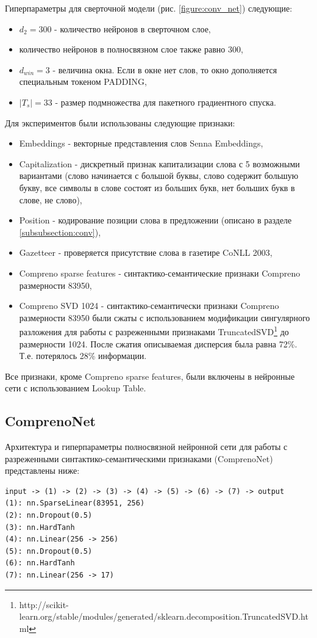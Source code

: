 Гиперпараметры для сверточной модели (рис. \ref{figure:conv_net}) следующие:
\begin{itemize}
\item $d_2 = 300$ - количество нейронов в сверточном слое,
\item количество нейронов в полносвязном слое также равно 300,
\item $d_{win} = 3$ - величина окна. Если в окне нет слов, то окно дополняется специальным токеном PADDING,
\item $|T_s|=33$ - размер подмножества для пакетного градиентного спуска.
\end{itemize}

Для экспериментов были использованы следующие признаки:
\begin{itemize}
\item Embeddings - векторные представления слов Senna Embeddings,
\item Capitalization - дискретный признак капитализации слова с 5 возможными вариантами
(слово начинается с большой буквы, слово содержит большую букву,
все символы в слове состоят из больших букв, нет больших букв в слове, не слово),
\item Position - кодирование позиции слова в предложении (описано в разделе \ref{subsubsection:conv}),
\item Gazetteer - проверяется присутствие слова в газетире CoNLL 2003,
\item Compreno sparse features - синтактико-се\-ман\-ти\-ческие признаки Compreno размерности 83950,
\item Compreno SVD 1024 - синтактико-семантически признаки Compreno размерности 83950 были сжаты с использованием
модификации сингулярного разложения для работы с разреженными признаками
TruncatedSVD\footnote{http://scikit-learn.org/stable/modules/generated/sklearn.decomposition.TruncatedSVD.html}
до размерности 1024. После сжатия описываемая дисперсия была равна 72\%. Т.е. потерялось 28\% информации.
\end{itemize}

Все признаки, кроме Compreno sparse features, были включены в нейронные сети с использованием Lookup Table.


\subsection{ComprenoNet}

Архитектура и гиперпараметры полносвязной нейронной сети для работы с разреженными
синтактико-семантическими признаками (ComprenoNet) представлены ниже:
\begin{lstlisting}
input -> (1) -> (2) -> (3) -> (4) -> (5) -> (6) -> (7) -> output
(1): nn.SparseLinear(83951, 256)
(2): nn.Dropout(0.5)
(3): nn.HardTanh
(4): nn.Linear(256 -> 256)
(5): nn.Dropout(0.5)
(6): nn.HardTanh
(7): nn.Linear(256 -> 17)
\end{lstlisting}

